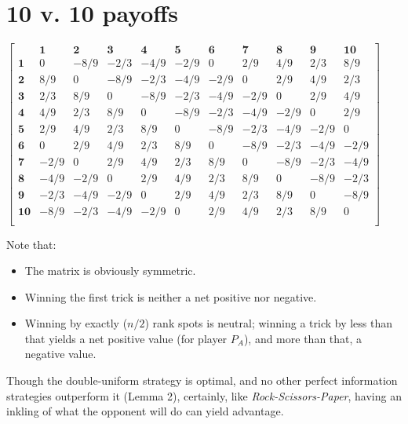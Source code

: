 \documentclass[11pt, oneside]{article} 	%
\begin{document}
\section{10 v. 10 payoffs}

\setcounter{MaxMatrixCols}{20}

$\begin{bmatrix}
& \mathbf{1} & \mathbf{2} & \mathbf{3} & \mathbf{4} & \mathbf{5} & \mathbf{6} &\mathbf{7} & \mathbf{8} &\mathbf{9} & \mathbf{10} \\ 
\mathbf{1} & 0 & -8/9 & -2/3 & -4/9 & -2/9 & 0 & 2/9 & 4/9 & 2/3 & 8/9 \\
\mathbf{2} & 8/9 & 0 & -8/9 & -2/3 & -4/9 & -2/9 & 0 & 2/9 & 4/9 & 2/3 \\
\mathbf{3} & 2/3 & 8/9 & 0 & -8/9 & -2/3 & -4/9 & -2/9 & 0 & 2/9 & 4/9 \\
\mathbf{4} & 4/9 & 2/3 & 8/9 & 0 & -8/9 & -2/3 & -4/9 & -2/9 & 0 & 2/9 \\
\mathbf{5} & 2/9 & 4/9 & 2/3 & 8/9 & 0 & -8/9 & -2/3 & -4/9 & -2/9 & 0 \\
\mathbf{6} & 0 & 2/9 & 4/9 & 2/3 & 8/9 & 0 & -8/9 & -2/3 & -4/9 & -2/9 \\
\mathbf{7} & -2/9 & 0 & 2/9 & 4/9 & 2/3 & 8/9 & 0 & -8/9 & -2/3 & -4/9 \\
\mathbf{8} & -4/9 & -2/9 & 0 & 2/9 & 4/9 & 2/3 & 8/9 & 0 & -8/9 & -2/3 \\
\mathbf{9} & -2/3 & -4/9 & -2/9 & 0 & 2/9 & 4/9 & 2/3 & 8/9 & 0 & -8/9 \\
\mathbf{10} & -8/9 & -2/3 & -4/9 & -2/9 & 0 & 2/9 & 4/9 & 2/3 & 8/9 & 0 \\
\end{bmatrix}
$

Note that:

\begin{itemize}
\item The matrix is obviously symmetric.
\item Winning the first trick is neither a net positive nor negative.
\item Winning by exactly ($n/2$) rank spots is neutral; winning a trick by less than that yields a net positive value (for player $P_A$), and more than that, a negative value.
\end{itemize}

Though the double-uniform strategy is optimal, and no other perfect information strategies outperform it (Lemma 2), certainly, like \emph{Rock-Scissors-Paper}, having an inkling of what the opponent will do can yield advantage. 
\end{document}
